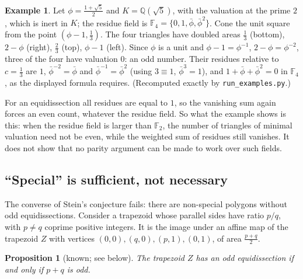 \documentclass[11pt]{article}
\newtheorem{proposition}[theorem]{Proposition}
\theoremstyle{definition}
\newtheorem{example}[theorem]{Example}
\newcommand{\Q}{\mathbb{Q}}
\newcommand{\F}{\mathbb{F}}
\newcommand{\tL}[1]{\texttt{#1}}
\begin{document}
\begin{example}\label{ex:fan}
Let $\phi=\frac{1+\sqrt5}2$ and $K=\Q(\sqrt5)$, with the valuation at the prime $2$, which is inert
in $K$; the residue field is $\F_4=\{0,1,\bar\phi,\bar\phi^2\}$. Cone the unit square from the point
$(\phi-1,\tfrac13)$. The four triangles have doubled areas $\tfrac13$ (bottom), $2-\phi$ (right),
$\tfrac23$ (top), $\phi-1$ (left). Since $\phi$ is a unit and $\phi-1=\phi^{-1}$,
$2-\phi=\phi^{-2}$, three of the four have valuation $0$: an odd number. Their residues relative to
$c=\tfrac13$ are $1$, $\bar\phi^{-2}=\bar\phi$ and $\bar\phi^{-1}=\bar\phi^2$ (using $3\equiv1$,
$\bar\phi^3=1$), and $1+\bar\phi+\bar\phi^2=0$ in $\F_4$, as the displayed formula requires.
(Recomputed exactly by \tL{run\_examples.py}.)
\end{example}

For an equidissection all residues are equal to $1$, so the vanishing sum again forces an even
count, whatever the residue field. So what the example shows is this: when the residue field is
larger than $\F_2$, the number of triangles of minimal valuation need not be even, while the
weighted sum of residues still vanishes. It does not show that no parity argument can be made to
work over such fields.

\subsection{``Special'' is sufficient, not necessary}\label{sec:trap}

The converse of Stein's conjecture fails: there are non-special polygons without odd
equidissections. Consider a trapezoid whose parallel sides have ratio $p/q$, with $p\ne q$ coprime
positive integers. It is the image under an affine map of the trapezoid $Z$ with vertices
$(0,0),(q,0),(p,1),(0,1)$, of area $\frac{p+q}2$.

\begin{proposition}[known; see below]\label{prop:trap}
The trapezoid $Z$ has an odd equidissection if and only if $p+q$ is odd.
\end{proposition}
\end{document}
